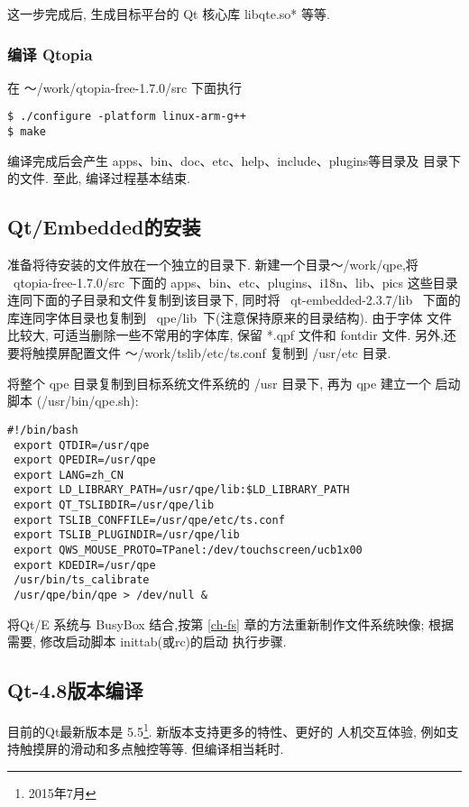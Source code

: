     这一步完成后, 生成目标平台的 Qt 核心库 libqte.so* 等等.

\subsubsection{编译 Qtopia}
	在 ～/work/qtopia-free-1.7.0/src 下面执行

\begin{boxedminipage}{.9\textwidth}
\begin{verbatim} 
$ ./configure -platform linux-arm-g++
$ make
\end{verbatim}
\end{boxedminipage}

	编译完成后会产生 apps、bin、doc、etc、help、include、plugins等目录及
目录下的文件. 至此, 编译过程基本结束.

\subsection{Qt/Embedded的安装}
	准备将待安装的文件放在一个独立的目录下. 新建一个目录～/work/qpe,将
~qtopia-free-1.7.0/src 下面的 apps、bin、etc、plugins、i18n、lib、pics
这些目录连同下面的子目录和文件复制到该目录下, 同时将 ~qt-embedded-2.3.7/lib~
下面的库连同字体目录也复制到 ~qpe/lib~下(注意保持原来的目录结构). 由于字体
文件比较大, 可适当删除一些不常用的字体库, 保留 *.qpf 文件和 fontdir 文件.
另外,还要将触摸屏配置文件 ～/work/tslib/etc/ts.conf 复制到 /usr/etc 目录.

	将整个 qpe 目录复制到目标系统文件系统的 /usr 目录下, 再为 qpe 建立一个
启动脚本 (/usr/bin/qpe.sh):

\lstset{language=make, frameround=ftft}

\begin{lstlisting}[frame=trBL]
 #!/bin/bash
 export QTDIR=/usr/qpe
 export QPEDIR=/usr/qpe
 export LANG=zh_CN
 export LD_LIBRARY_PATH=/usr/qpe/lib:$LD_LIBRARY_PATH
 export QT_TSLIBDIR=/usr/qpe/lib
 export TSLIB_CONFFILE=/usr/qpe/etc/ts.conf
 export TSLIB_PLUGINDIR=/usr/qpe/lib
 export QWS_MOUSE_PROTO=TPanel:/dev/touchscreen/ucb1x00
 export KDEDIR=/usr/qpe
 /usr/bin/ts_calibrate
 /usr/qpe/bin/qpe > /dev/null &
\end{lstlisting}

	将Qt/E 系统与 BusyBox 结合,按第{} \ref{ch-fs}
章的方法重新制作文件系统映像; 根据需要, 修改启动脚本 inittab(或rc)的启动
执行步骤.

\subsection{Qt-4.8版本编译}
目前的Qt最新版本是 5.5\footnote{2015年7月}. 新版本支持更多的特性、更好的
人机交互体验, 例如支持触摸屏的滑动和多点触控等等. 但编译相当耗时.

